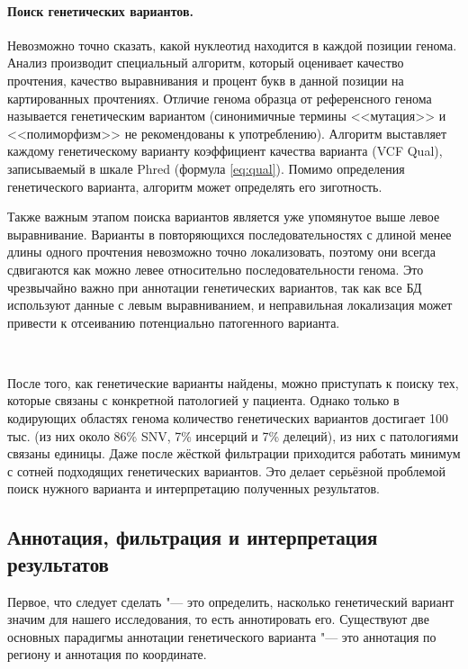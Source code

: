 \documentclass[a4paper,12pt]{article}
\begin{document}
\paragraph{Поиск генетических вариантов.}
Невозможно точно сказать, какой нуклеотид находится в каждой позиции генома.
Анализ производит специальный алгоритм, который оценивает качество прочтения, качество выравнивания и процент букв в данной позиции на картированных прочтениях.
Отличие генома образца от референсного генома называется генетическим вариантом (синонимичные термины <<мутация>> и <<полиморфизм>> не рекомендованы к употреблению\cite{richards}).
Алгоритм выставляет каждому генетическому варианту коэффициент качества варианта (VCF Qual), записываемый в шкале Phred (формула \ref{eq:qual}).
Помимо определения генетического варианта, алгоритм может определять его зиготность.

Также важным этапом поиска вариантов является уже упомянутое выше левое выравнивание.
Варианты в повторяющихся последовательностях с длиной менее длины одного прочтения невозможно точно локализовать, поэтому они всегда сдвигаются как можно левее относительно последовательности генома.
Это чрезвычайно важно при аннотации генетических вариантов, так как все БД используют данные с левым выравниванием, и неправильная локализация может привести к отсеиванию потенциально патогенного варианта.

~

После того, как генетические варианты найдены, можно приступать к поиску тех, которые связаны с конкретной патологией у пациента.
Однако только в кодирующих областях генома количество генетических вариантов достигает 100 тыс. (из них около 86\% SNV, 7\% инсерций и 7\% делеций)\cite{supernat}, из них с патологиями связаны единицы.
Даже после жёсткой фильтрации приходится работать минимум с сотней подходящих генетических вариантов.
Это делает серьёзной проблемой поиск нужного варианта и интерпретацию полученных результатов.

\subsection{Аннотация, фильтрация и интерпретация результатов}

Первое, что следует сделать "--- это определить, насколько генетический вариант значим для нашего исследования, то есть аннотировать его.
Существуют две основных парадигмы аннотации генетического варианта "--- это аннотация по региону и аннотация по координате.
\end{document}
